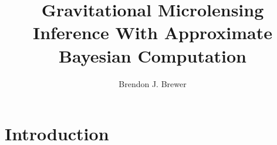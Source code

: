 \documentclass[letterpaper, 11pt]{article}
\title{Gravitational Microlensing Inference With Approximate Bayesian
Computation}
\author{Brendon J. Brewer}
\begin{document}
\maketitle

\section{Introduction}
\end{document}
